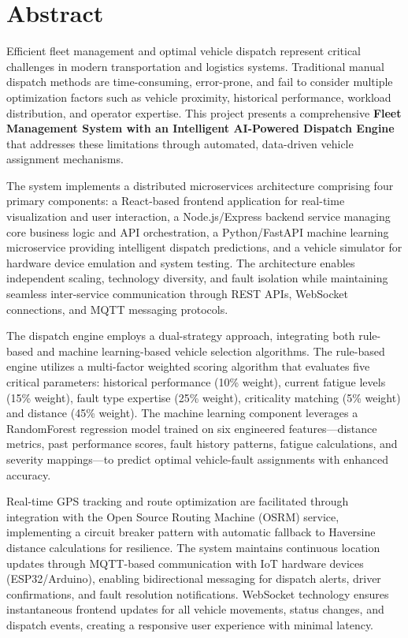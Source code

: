\chapter*{Abstract}

Efficient fleet management and optimal vehicle dispatch represent critical challenges in modern transportation and logistics systems. Traditional manual dispatch methods are time-consuming, error-prone, and fail to consider multiple optimization factors such as vehicle proximity, historical performance, workload distribution, and operator expertise. This project presents a comprehensive \textbf{Fleet Management System with an Intelligent AI-Powered Dispatch Engine} that addresses these limitations through automated, data-driven vehicle assignment mechanisms.

The system implements a distributed microservices architecture comprising four primary components: a React-based frontend application for real-time visualization and user interaction, a Node.js/Express backend service managing core business logic and API orchestration, a Python/FastAPI machine learning microservice providing intelligent dispatch predictions, and a vehicle simulator for hardware device emulation and system testing. The architecture enables independent scaling, technology diversity, and fault isolation while maintaining seamless inter-service communication through REST APIs, WebSocket connections, and MQTT messaging protocols.

The dispatch engine employs a dual-strategy approach, integrating both rule-based and machine learning-based vehicle selection algorithms. The rule-based engine utilizes a multi-factor weighted scoring algorithm that evaluates five critical parameters: historical performance (10\% weight), current fatigue levels (15\% weight), fault type expertise (25\% weight), criticality matching (5\% weight) and distance (45\% weight). The machine learning component leverages a RandomForest regression model trained on six engineered features—distance metrics, past performance scores, fault history patterns, fatigue calculations, and severity mappings—to predict optimal vehicle-fault assignments with enhanced accuracy.

Real-time GPS tracking and route optimization are facilitated through integration with the Open Source Routing Machine (OSRM) service, implementing a circuit breaker pattern with automatic fallback to Haversine distance calculations for resilience. The system maintains continuous location updates through MQTT-based communication with IoT hardware devices (ESP32/Arduino), enabling bidirectional messaging for dispatch alerts, driver confirmations, and fault resolution notifications. WebSocket technology ensures instantaneous frontend updates for all vehicle movements, status changes, and dispatch events, creating a responsive user experience with minimal latency.

